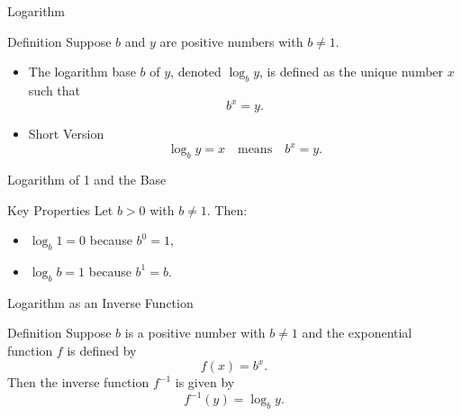 \documentclass{beamer}
\begin{document}
  \begin{frame}{Logarithm}
    \begin{block}{Definition}
      Suppose \(b\) and \(y\) are positive numbers with \(b\neq 1\). 
      \begin{itemize}
        \item The logarithm base \(b\) of \(y\), denoted \(\log_b y\), is defined as the unique number \(x\) such that
        \[
          b^x = y.
        \]
        \item  Short Version
        \[
          \log_b y = x \quad \text{means} \quad b^x = y.
        \]
      \end{itemize}
    \end{block}
  \end{frame}

  \begin{frame}{Logarithm of 1 and the Base}
    \begin{block}{Key Properties}
      Let \(b>0\) with \(b\neq 1\). Then:
      \begin{itemize}
        \item \(\log_b 1 = 0\) because \(b^0 = 1\),
        \item \(\log_b b = 1\) because \(b^1 = b\).
      \end{itemize}
    \end{block}
  \end{frame}

  \begin{frame}{Logarithm as an Inverse Function}
    \begin{block}{Definition}
      Suppose \(b\) is a positive number with \(b \neq 1\) and the exponential function \(f\) is defined by
      \[
        f(x) = b^x.
      \]
      Then the inverse function \(f^{-1}\) is given by
      \[
        f^{-1}(y) = \log_b y.
      \]
    \end{block}
  \end{frame}
  
\end{document}
